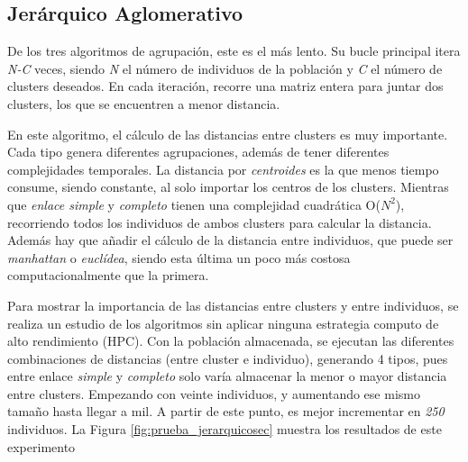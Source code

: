 

	\subsection{Jerárquico Aglomerativo}
	
		De los tres algoritmos de agrupación, este es el más lento. Su bucle principal itera \textit{N-C} veces, siendo \textit{N} el número de individuos de la población y \textit{C} el número de clusters deseados. En cada iteración, recorre una matriz entera para juntar dos clusters, los que se encuentren a menor distancia. 
		
		
		En este algoritmo, el cálculo de las distancias entre clusters es muy importante. Cada tipo genera diferentes agrupaciones, además de tener diferentes complejidades temporales. La distancia por \textit{centroides} es la que menos tiempo consume, siendo constante, al solo importar los centros de los clusters. Mientras que \textit{enlace simple} y \textit{completo} tienen una complejidad cuadrática O(\(N^{2}\)), recorriendo todos los individuos de ambos clusters para calcular la distancia. Además hay que añadir el cálculo de la distancia entre individuos, que puede ser \textit{manhattan} o \textit{euclídea}, siendo esta última un poco más costosa computacionalmente que la primera.
		

		Para mostrar la importancia de las distancias entre clusters y entre individuos, se realiza un estudio de los algoritmos sin aplicar ninguna estrategia computo de alto rendimiento (HPC). Con la población almacenada, se ejecutan las diferentes combinaciones de distancias (entre cluster e individuo), generando 4 tipos, pues entre enlace \textit{simple} y \textit{completo} solo varía almacenar la menor o mayor distancia entre clusters. Empezando con veinte individuos, y aumentando ese mismo tamaño hasta llegar a mil. A partir de este punto, es mejor incrementar en \textit{250} individuos. La Figura \ref{fig:prueba_jerarquicosec} muestra los resultados de este experimento 
		
